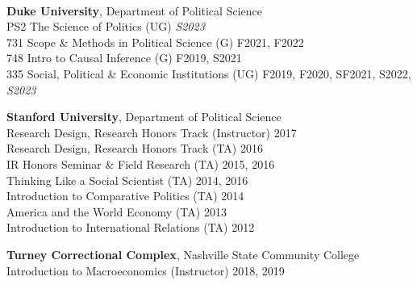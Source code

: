 \documentclass[11pt]{article}
\begin{document}
\vspace{.20in}
\begin{minipage}[t]{.21\textwidth}
	 \\
\end{minipage}
\begin{minipage}[t]{.79\textwidth}

	\textbf{Duke University}, Department of Political Science \\
	\hspace*{.1in} PS2 The Science of Politics (UG) \hfill \emph{S2023} \\
	\hspace*{.1in} 731 Scope \& Methods in Political Science (G) \hfill F2021, F2022 \\
	\hspace*{.1in} 748 Intro to Causal Inference (G) \hfill    F2019, S2021\\
	\hspace*{.1in} 335 Social, Political \& Economic Institutions (UG) \hfill    F2019, F2020, SF2021, S2022, \emph{S2023} \\
	\vspace*{-.1in}


	\vspace{.125in}
	\textbf{Stanford University}, Department of Political Science  \\
		\hspace*{.1in} Research Design, Research Honors Track (Instructor) \hfill    2017\\
		\hspace*{.1in} Research Design, Research Honors Track (TA)   \hfill    2016\\
		\hspace*{.1in} IR Honors Seminar \& Field Research (TA) \hfill 2015, 2016 \\
		\hspace*{.1in} Thinking Like a Social Scientist (TA)   \hfill   2014,  2016 \\
		\hspace*{.1in} Introduction to Comparative Politics (TA)  \hfill  2014\\
		\hspace*{.1in} America and the World Economy (TA)    \hfill  2013\\
    \hspace*{.1in} Introduction to International Relations (TA)  \hfill  2012\\
		\vspace*{-.1in}

		\vspace{.125in}
			\textbf{Turney Correctional Complex}, Nashville State Community College \\
			\hspace*{.1in} Introduction to Macroeconomics (Instructor) \hfill    2018, 2019\\
			\vspace*{-.1in}

\end{minipage}
\end{document}
